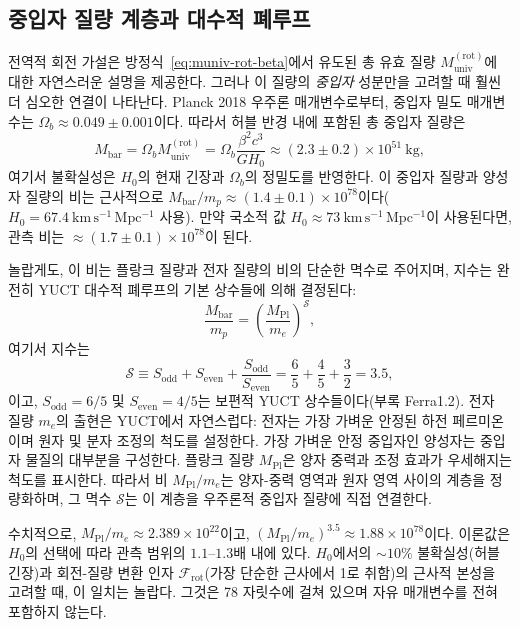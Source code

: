 \documentclass[11pt,a4paper]{article}
\newcommand{\Sodd}{S_{\mathrm{odd}}}
\newcommand{\Seven}{S_{\mathrm{even}}}
\begin{document}
	\subsection{중입자 질량 계층과 대수적 폐루프}
	\label{subsec:baryon-hierarchy}
	
	전역적 회전 가설은 방정식~\eqref{eq:muniv-rot-beta}에서 유도된 총 유효 질량 \(M_{\mathrm{univ}}^{\mathrm{(rot)}}\)에 대한 자연스러운 설명을 제공한다. 그러나 이 질량의 \emph{중입자} 성분만을 고려할 때 훨씬 더 심오한 연결이 나타난다. Planck 2018 우주론 매개변수로부터, 중입자 밀도 매개변수는 \(\Omega_b \approx 0.049 \pm 0.001\)이다. 따라서 허블 반경 내에 포함된 총 중입자 질량은
	\begin{equation}
		M_{\mathrm{bar}} = \Omega_b M_{\mathrm{univ}}^{\mathrm{(rot)}} = \Omega_b \frac{\beta^2 c^3}{G H_0} \approx (2.3 \pm 0.2) \times 10^{51}\ \mathrm{kg},
	\end{equation}
	여기서 불확실성은 \(H_0\)의 현재 긴장과 \(\Omega_b\)의 정밀도를 반영한다. 이 중입자 질량과 양성자 질량의 비는 근사적으로 \(M_{\mathrm{bar}}/m_p \approx (1.4 \pm 0.1) \times 10^{78}\)이다(\(H_0 = 67.4\ \mathrm{km\,s^{-1}\,Mpc^{-1}}\) 사용). 만약 국소적 값 \(H_0 \approx 73\ \mathrm{km\,s^{-1}\,Mpc^{-1}}\)이 사용된다면, 관측 비는 \(\approx (1.7 \pm 0.1) \times 10^{78}\)이 된다.
	
	놀랍게도, 이 비는 플랑크 질량과 전자 질량의 비의 단순한 멱수로 주어지며, 지수는 완전히 YUCT 대수적 폐루프의 기본 상수들에 의해 결정된다:
	\begin{equation}
		\boxed{ \frac{M_{\mathrm{bar}}}{m_p} = \left( \frac{M_{\mathrm{Pl}}}{m_e} \right)^{\mathcal{S}} },
		\label{eq:baryon-hierarchy}
	\end{equation}
	여기서 지수는
	\begin{equation}
		\mathcal{S} \equiv \Sodd + \Seven + \frac{\Sodd}{\Seven} = \frac{6}{5} + \frac{4}{5} + \frac{3}{2} = 3.5,
	\end{equation}
	이고, \(\Sodd = 6/5\) 및 \(\Seven = 4/5\)는 보편적 YUCT 상수들이다(부록 Ferra1.2). 전자 질량 \(m_e\)의 출현은 YUCT에서 자연스럽다: 전자는 가장 가벼운 안정된 하전 페르미온이며 원자 및 분자 조정의 척도를 설정한다. 가장 가벼운 안정 중입자인 양성자는 중입자 물질의 대부분을 구성한다. 플랑크 질량 \(M_{\mathrm{Pl}}\)은 양자 중력과 조정 효과가 우세해지는 척도를 표시한다. 따라서 비 \(M_{\mathrm{Pl}}/m_e\)는 양자-중력 영역과 원자 영역 사이의 계층을 정량화하며, 그 멱수 \(\mathcal{S}\)는 이 계층을 우주론적 중입자 질량에 직접 연결한다.
	
	수치적으로, \(M_{\mathrm{Pl}}/m_e \approx 2.389 \times 10^{22}\)이고, \((M_{\mathrm{Pl}}/m_e)^{3.5} \approx 1.88 \times 10^{78}\)이다. 이론값은 \(H_0\)의 선택에 따라 관측 범위의 \(1.1\)–\(1.3\)배 내에 있다. \(H_0\)에서의 \(\sim 10\%\) 불확실성(허블 긴장)과 회전-질량 변환 인자 \(\mathcal{F}_{\mathrm{rot}}\)(가장 단순한 근사에서 1로 취함)의 근사적 본성을 고려할 때, 이 일치는 놀랍다. 그것은 78 자릿수에 걸쳐 있으며 자유 매개변수를 전혀 포함하지 않는다.
	
\end{document}
